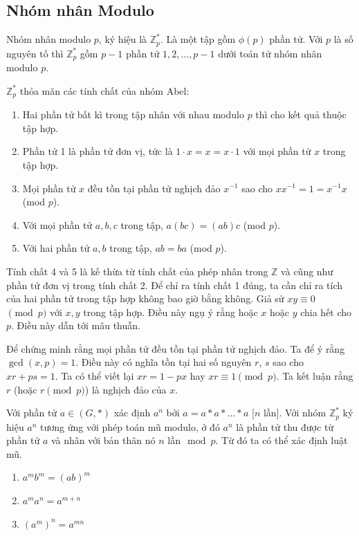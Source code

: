 \documentclass[../main.tex]{subfiles}
\begin{document}
\begin{dn}
\subsection{Nhóm nhân Modulo}
Nhóm nhân modulo $p$, ký hiệu là $\mathbb{Z}^*_p$. Là một tập gồm $\phi(p)$ phần tử. Với $p$ là số nguyên tố thì $\mathbb{Z}^*_p$ gồm $p-1$ phần tử ${1,2,...,p-1}$ dưới toán tử nhóm nhân modulo $p$. 
\end{dn}
\begin{nx}
$\mathbb{Z}^*_p$ thỏa mãn các tính chất của nhóm Abel:
\begin{enumerate}
    \item Hai phần tử bất kì trong tập nhân với nhau modulo $p$ thì cho kết quả thuộc tập hợp.
    \item Phần tử 1 là phần tử đơn vị, tức là $1\cdot x = x = x \cdot 1$ với mọi phần tử $x$ trong tập hợp.
    \item Mọi phần tử $x$ đều tồn tại phần tử nghịch đảo $x^{-1}$ sao cho $xx^{-1} = 1 = x^{-1}x$ (mod $p$).
    \item Với mọi phần tử $a,b,c$ trong tập, $a(bc) = (ab)c$ (mod $p$).
    \item Với hai phần tử $a,b$ trong tập, $ab = ba$ (mod $p$).
\end{enumerate}

\end{nx}

Tính chất 4 và 5 là kế thừa từ tính chất của phép nhân trong $\mathbb{Z}$ và cũng như phần tử đơn vị trong tính chất 2. Để chỉ ra tính chất 1 đúng, ta cần chỉ ra tích của hai phần tử trong tập hợp không bao giờ bằng không. Giả sử $xy \equiv 0$$\pmod p$ với $x,y$ trong tập hợp. Điều này ngụ ý rằng hoặc $x$ hoặc $y$ chia hết cho $p$. Điều này dẫn tới mâu thuẫn.

Để chứng minh rằng mọi phần tử đều tồn tại phần tử nghịch đảo. Ta để ý rằng $\gcd(x,p) = 1$. Điều này có nghĩa tồn tại hai số nguyên $r$, $s$ sao cho $xr + ps =1$. Ta có thể viết lại $xr = 1 - px$ hay $xr \equiv 1 \pmod p$. Ta kết luận rằng $r$ (hoặc $r\pmod p$) là nghịch đảo của $x$.

Với phần tử $a \in (G,*)$  xác định $a^n$ bởi $a = a*a*\dots*a$ [$n$ lần]. Với nhóm $\mathbb{Z}^*_p$ ký hiệu $a^n$ tương ứng với phép toán mũ modulo, ở đó $a^n$ là phần tử thu được từ phần tử $a$ và nhân với bản thân nó $n$ lần$\mod p$.
Từ đó ta có thể xác định luật mũ.
\begin{enumerate}
    \item $a^mb^m = (ab)^m$
    \item $a^ma^n = a^{m+n}$
    \item $(a^m)^n = a^{mn}$
\end{enumerate}
\end{document}
